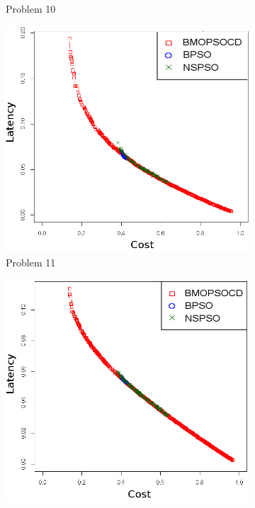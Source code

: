 \begin{figure}[]
\begin{subfigure}{0.30\textwidth}
	   \caption{Problem 10}
   \end{subfigure}
   \begin{subfigure}{0.30\textwidth}
       \includegraphics[width=\textwidth]{pics/total11.png}
	   \caption{Problem 11}
   \end{subfigure}
   \begin{subfigure}{0.30\textwidth}
       \includegraphics[width=\textwidth]{pics/total12.png}

\end{subfigure}
\end{figure}
